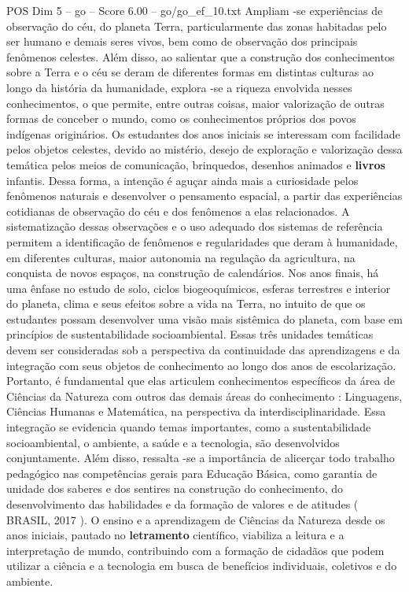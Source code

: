 \begin{textsample}{POS Dim 5 – go – Score 6.00 – go/go\_ef\_10.txt}
Ampliam -se experiências de observação do céu, do planeta Terra, particularmente das zonas habitadas pelo ser humano e demais seres vivos, bem como de observação dos principais fenômenos celestes.
Além disso, ao salientar que a construção dos conhecimentos sobre a Terra e o céu se deram de diferentes formas em distintas culturas ao longo da história da humanidade, explora -se a riqueza envolvida nesses conhecimentos, o que permite, entre outras coisas, maior valorização de outras formas de conceber o mundo, como os conhecimentos próprios dos povos indígenas originários.
Os estudantes dos anos iniciais se interessam com facilidade pelos objetos celestes, devido ao mistério, desejo de exploração e valorização dessa temática pelos meios de comunicação, brinquedos, desenhos animados e \textbf{livros} infantis.
Dessa forma, a intenção é aguçar ainda mais a curiosidade pelos fenômenos naturais e desenvolver o pensamento espacial, a partir das experiências cotidianas de observação do céu e dos fenômenos a elas relacionados.
A sistematização dessas observações e o uso adequado dos sistemas de referência permitem a identificação de fenômenos e regularidades que deram à humanidade, em diferentes culturas, maior autonomia na regulação da agricultura, na conquista de novos espaços, na construção de calendários.
Nos anos finais, há uma ênfase no estudo de solo, ciclos biogeoquímicos, esferas terrestres e interior do planeta, clima e seus efeitos sobre a vida na Terra, no intuito de que os estudantes possam desenvolver uma visão mais sistêmica do planeta, com base em princípios de sustentabilidade socioambiental.
Essas três unidades temáticas devem ser consideradas sob a perspectiva da continuidade das aprendizagens e da integração com seus objetos de conhecimento ao longo dos anos de escolarização.
Portanto, é fundamental que elas articulem conhecimentos específicos da área de Ciências da Natureza com outros das demais áreas do conhecimento : Linguagens, Ciências Humanas e Matemática, na perspectiva da interdisciplinaridade.
Essa integração se evidencia quando temas importantes, como a sustentabilidade socioambiental, o ambiente, a saúde e a tecnologia, são desenvolvidos conjuntamente.
Além disso, ressalta -se a importância de alicerçar todo trabalho pedagógico nas competências gerais para Educação Básica, como garantia de unidade dos saberes e dos sentires na construção do conhecimento, do desenvolvimento das habilidades e da formação de valores e de atitudes ( BRASIL, 2017 ).
O ensino e a aprendizagem de Ciências da Natureza desde os anos iniciais, pautado no \textbf{letramento} científico, viabiliza a leitura e a interpretação de mundo, contribuindo com a formação de cidadãos que podem utilizar a ciência e a tecnologia em busca de benefícios individuais, coletivos e do ambiente.

\end{textsample}
